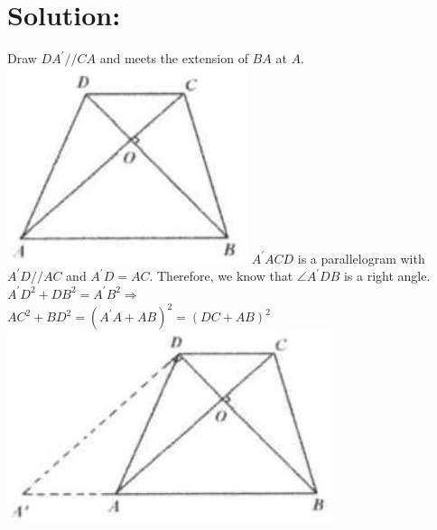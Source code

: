 \documentclass[10pt]{article}
\begin{document}
\section*{Solution:}
Draw \(D A^{\prime} / / C A\) and meets the extension of \(B A\) at \(A\).\\
\includegraphics[max width=\textwidth]{2025_04_17_97bc1f7e44d93c271a88g-117} \(A^{\prime} A C D\) is a parallelogram with \(A^{\prime} D / / A C\) and \(A^{\prime} D=A C\). Therefore, we know that \(\angle A^{\prime} D B\) is a right angle.\\
\(A^{\prime} D^{2}+D B^{2}=A^{\prime} B^{2} \Rightarrow\)\\
\(A C^{2}+B D^{2}=\left(A^{\prime} A+A B\right)^{2}=(D C+A B)^{2}\)\\
\includegraphics[max width=\textwidth, center]{2025_04_17_97bc1f7e44d93c271a88g-117(3)}
\end{document}
